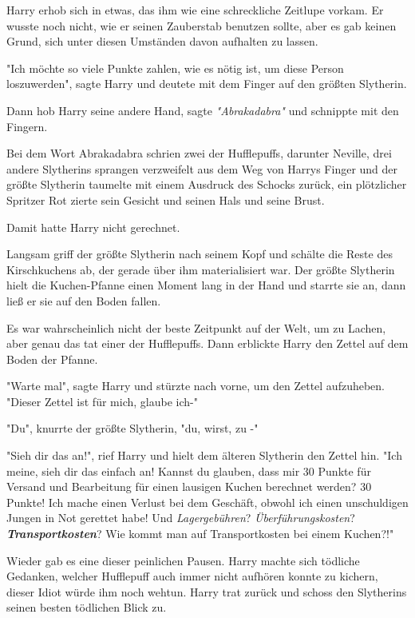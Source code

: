 {Harry erhob sich in etwas, das ihm wie eine schreckliche Zeitlupe vorkam. Er wusste noch nicht, wie er seinen Zauberstab benutzen sollte, aber es gab keinen Grund, sich unter diesen Umständen davon aufhalten zu lassen.

"Ich möchte so viele Punkte zahlen, wie es nötig ist, um diese Person loszuwerden", sagte Harry und deutete mit dem Finger auf den größten Slytherin.

Dann hob Harry seine andere Hand, sagte \emph{"Abrakadabra"} und schnippte mit den Fingern.

Bei dem Wort Abrakadabra schrien zwei der Hufflepuffs, darunter Neville, drei andere Slytherins sprangen verzweifelt aus dem Weg von Harrys Finger und der größte Slytherin taumelte mit einem Ausdruck des Schocks zurück, ein plötzlicher Spritzer Rot zierte sein Gesicht und seinen Hals und seine Brust.

Damit hatte Harry nicht gerechnet.

Langsam griff der größte Slytherin nach seinem Kopf und schälte die Reste des Kirschkuchens ab, der gerade über ihm materialisiert war. Der größte Slytherin hielt die Kuchen-Pfanne einen Moment lang in der Hand und starrte sie an, dann ließ er sie auf den Boden fallen.

Es war wahrscheinlich nicht der beste Zeitpunkt auf der Welt, um zu Lachen, aber genau das tat einer der Hufflepuffs. Dann erblickte Harry den Zettel auf dem Boden der Pfanne.

"Warte mal", sagte Harry und stürzte nach vorne, um den Zettel aufzuheben. "Dieser Zettel ist für mich, glaube ich-"

"Du", knurrte der größte Slytherin, "du, wirst, zu -"

"Sieh dir das an!", rief Harry und hielt dem älteren Slytherin den Zettel hin. "Ich meine, sieh dir das einfach an! Kannst du glauben, dass mir 30 Punkte für Versand und Bearbeitung für einen lausigen Kuchen berechnet werden? 30 Punkte! Ich mache einen Verlust bei dem Geschäft, obwohl ich einen unschuldigen Jungen in Not gerettet habe! Und \emph{Lagergebühren}? \emph{Überführungskosten}? \textbf{\emph{Transportkosten}}? Wie kommt man auf Transportkosten bei einem Kuchen?!"

Wieder gab es eine dieser peinlichen Pausen. Harry machte sich tödliche Gedanken, welcher Hufflepuff auch immer nicht aufhören konnte zu kichern, dieser Idiot würde ihm noch wehtun. Harry trat zurück und schoss den Slytherins seinen besten tödlichen Blick zu.

}
